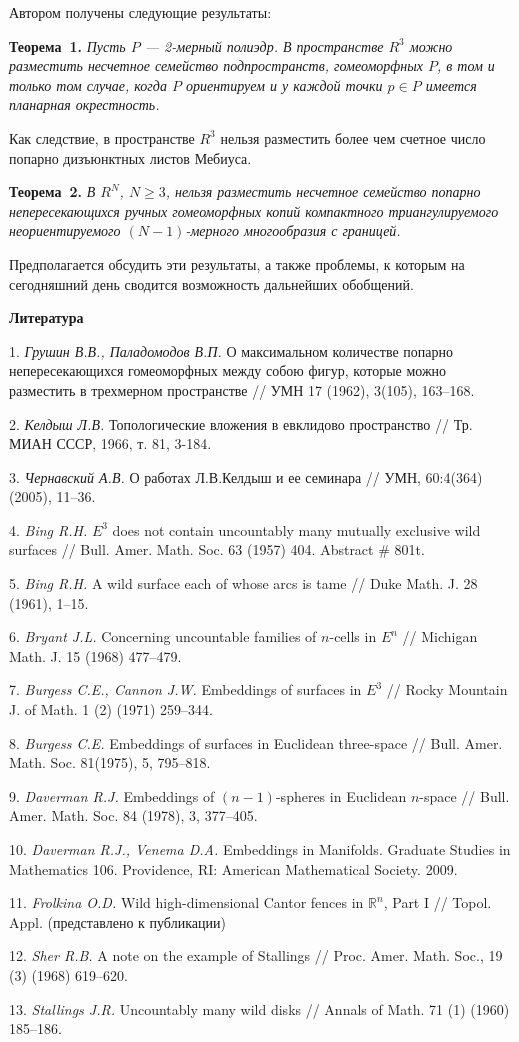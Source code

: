 Автором получены
следующие результаты:

\textbf{Теорема~1.}
{\it Пусть $P$ --- 2-мерный полиэдр.
В пространстве $R^3$ можно разместить несчетное
семейство подпространств, гомеоморфных $P$,
в том и только том случае, когда
$P$ ориентируем и у каждой точки
$p\in P$
имеется планарная окрестность.}

Как следствие, в пространстве $R^3$ нельзя разместить более чем счетное число
попарно дизъюнктных листов Мебиуса.

\textbf{Теорема~2.} {\it
В $R^N$, $N\geqslant 3$,
нельзя разместить несчетное семейство попарно непересекающихся
ручных гомеоморфных копий
компактного триангулируемого
неориентируемого $(N-1)$-мерного многообразия с границей.}

Предполагается обсудить эти результаты,
а также проблемы,
к которым
на сегодняшний день
сводится возможность дальнейших
обобщений.


\smallskip \centerline{\bf Литература}\nopagebreak

1.
{\it Грушин В.В., Паладомодов В.П.}
О максимальном количестве попарно непересекающихся гомеоморфных между собою фигур, которые можно разместить в трехмерном пространстве
 // УМН 17 (1962), 3(105), 163--168.

2.
{\it Келдыш Л.В.}
Топологические вложения в евклидово пространство
// Тр. МИАН СССР, 1966,	 т. 81, 3-184.

3.
{\it Чернавский А.В.}
О работах Л.В.Келдыш и ее семинара //
УМН, 60:4(364) (2005), 11–36.


4.
{\it Bing R.H.}
$E^3$ does not contain
uncountably many mutually exclusive wild
surfaces //
Bull. Amer. Math. Soc.
63 (1957) 404.
Abstract \# 801t.

5.
{\it Bing R.H.}
A wild surface each of whose arcs is tame //
Duke Math. J. 28 (1961), 1--15.

6.
{\it Bryant J.L.}
Concerning uncountable families of $n$-cells in $E^n$ //
Michigan Math. J. 15 (1968) 477--479.


7.
{\it Burgess C.E., Cannon J.W.}
Embeddings of surfaces in $E^3$ //
Rocky Mountain J. of Math.
1 (2) (1971) 259--344.

8.
{\it Burgess C.E.}
Embeddings of surfaces in Euclidean three-space //
Bull. Amer. Math. Soc.
81(1975), 5, 795--818.

9.
{\it Daverman R.J.}
Embeddings of $(n-1)$-spheres in
Euclidean $n$-space //
Bull. Amer. Math. Soc.
84 (1978), 3, 377--405.

10.
{\it Daverman R.J., Venema D.A.}
Embeddings in Manifolds.
Graduate Studies in Mathematics 106. Providence, RI: American Mathematical Society.
2009.

11.
{\it Frolkina O.D.}
Wild high-dimensional Cantor fences in $\mathbb R^n$, Part I // Topol. Appl.
\foreignlanguage{russian}{
	(представлено к публикации)
}

12.
{\it Sher R.B.}
A note on the example of Stallings //
Proc. Amer. Math. Soc., 19 (3) (1968) 619--620.

13.
{\it Stallings J.R.}
Uncountably many wild disks //
Annals of Math. 71 (1) (1960) 185--186.

